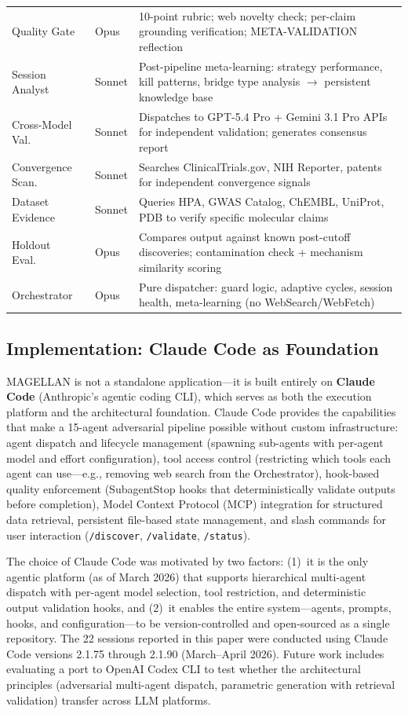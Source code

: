 \begin{table}[t]
\begin{tabular}{@{}llp{7.5cm}@{}}
Quality Gate & Opus & 10-point rubric; web novelty check; per-claim grounding verification; META-VALIDATION reflection \\
Session Analyst & Sonnet & Post-pipeline meta-learning: strategy performance, kill patterns, bridge type analysis $\to$ persistent knowledge base \\
Cross-Model Val.\ & Sonnet & Dispatches to GPT-5.4 Pro + Gemini 3.1 Pro APIs for independent validation; generates consensus report \\
Convergence Scan.\ & Sonnet & Searches ClinicalTrials.gov, NIH Reporter, patents for independent convergence signals \\
Dataset Evidence & Sonnet & Queries HPA, GWAS Catalog, ChEMBL, UniProt, PDB to verify specific molecular claims \\
Holdout Eval.\ & Opus & Compares output against known post-cutoff discoveries; contamination check + mechanism similarity scoring \\
Orchestrator & Opus & Pure dispatcher: guard logic, adaptive cycles, session health, meta-learning (no WebSearch/WebFetch) \\
\bottomrule
\end{tabular}
\end{table}

\subsection{Implementation: Claude Code as Foundation}
\label{sec:implementation}

MAGELLAN is not a standalone application---it is built entirely on \textbf{Claude Code} (Anthropic's agentic coding CLI), which serves as both the execution platform and the architectural foundation. Claude Code provides the capabilities that make a 15-agent adversarial pipeline possible without custom infrastructure: agent dispatch and lifecycle management (spawning sub-agents with per-agent model and effort configuration), tool access control (restricting which tools each agent can use---e.g., removing web search from the Orchestrator), hook-based quality enforcement (SubagentStop hooks that deterministically validate outputs before completion), Model Context Protocol (MCP) integration for structured data retrieval, persistent file-based state management, and slash commands for user interaction (\texttt{/discover}, \texttt{/validate}, \texttt{/status}).

The choice of Claude Code was motivated by two factors: (1)~it is the only agentic platform (as of March 2026) that supports hierarchical multi-agent dispatch with per-agent model selection, tool restriction, and deterministic output validation hooks, and (2)~it enables the entire system---agents, prompts, hooks, and configuration---to be version-controlled and open-sourced as a single repository. The 22 sessions reported in this paper were conducted using Claude Code versions 2.1.75 through 2.1.90 (March--April 2026). Future work includes evaluating a port to OpenAI Codex CLI to test whether the architectural principles (adversarial multi-agent dispatch, parametric generation with retrieval validation) transfer across LLM platforms.

